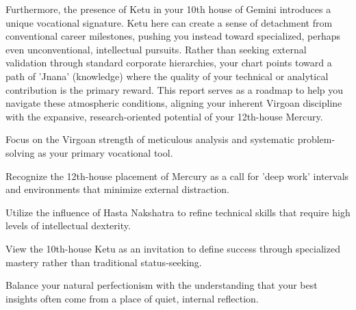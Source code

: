 {\fontsize{9}{13}\selectfont Furthermore, the presence of Ketu in your 10th house of Gemini introduces a unique vocational signature. Ketu here can create a sense of detachment from conventional career milestones, pushing you instead toward specialized, perhaps even unconventional, intellectual pursuits. Rather than seeking external validation through standard corporate hierarchies, your chart points toward a path of 'Jnana' (knowledge) where the quality of your technical or analytical contribution is the primary reward. This report serves as a roadmap to help you navigate these atmospheric conditions, aligning your inherent Virgoan discipline with the expansive, research-oriented potential of your 12th-house Mercury.}\par\vspace{1.8mm}

\begin{diamondlist}
  \item {\fontsize{8.5}{12}\selectfont Focus on the Virgoan strength of meticulous analysis and systematic problem-solving as your primary vocational tool.}
  \item {\fontsize{8.5}{12}\selectfont Recognize the 12th-house placement of Mercury as a call for 'deep work' intervals and environments that minimize external distraction.}
  \item {\fontsize{8.5}{12}\selectfont Utilize the influence of Hasta Nakshatra to refine technical skills that require high levels of intellectual dexterity.}
  \item {\fontsize{8.5}{12}\selectfont View the 10th-house Ketu as an invitation to define success through specialized mastery rather than traditional status-seeking.}
  \item {\fontsize{8.5}{12}\selectfont Balance your natural perfectionism with the understanding that your best insights often come from a place of quiet, internal reflection.}
\end{diamondlist}


\label{topic2}

